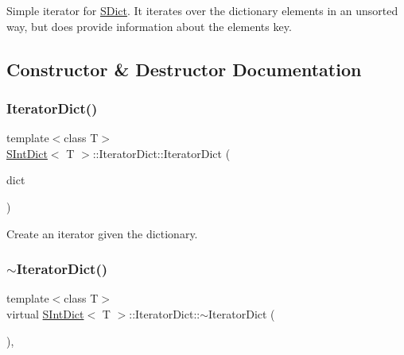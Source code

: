 Simple iterator for \mbox{\hyperlink{class_s_dict}{S\+Dict}}. It iterates over the dictionary elements in an unsorted way, but does provide information about the element\textquotesingle{}s key. 

\subsection{Constructor \& Destructor Documentation}
\mbox{\label{class_s_int_dict_1_1_iterator_dict_a6bbd7ab69b3df8c5c1a2bc2e4efea152}} 
\subsubsection{\texorpdfstring{IteratorDict()}{IteratorDict()}}
{\footnotesize\ttfamily template$<$class T$>$ \\
\mbox{\hyperlink{class_s_int_dict}{S\+Int\+Dict}}$<$ T $>$\+::Iterator\+Dict\+::\+Iterator\+Dict (\begin{DoxyParamCaption}\item[{const \mbox{\hyperlink{class_s_int_dict}{S\+Int\+Dict}}$<$ T $>$ \&}]{dict }\end{DoxyParamCaption})\hspace{0.3cm}{\ttfamily [inline]}}

Create an iterator given the dictionary. \mbox{\label{class_s_int_dict_1_1_iterator_dict_af37503cbd054f367959b0343bf172fd9}} 
\subsubsection{\texorpdfstring{$\sim$IteratorDict()}{~IteratorDict()}}
{\footnotesize\ttfamily template$<$class T$>$ \\
virtual \mbox{\hyperlink{class_s_int_dict}{S\+Int\+Dict}}$<$ T $>$\+::Iterator\+Dict\+::$\sim$\+Iterator\+Dict (\begin{DoxyParamCaption}{ }\end{DoxyParamCaption})\hspace{0.3cm}{\ttfamily [inline]}, {\ttfamily [virtual]}}

